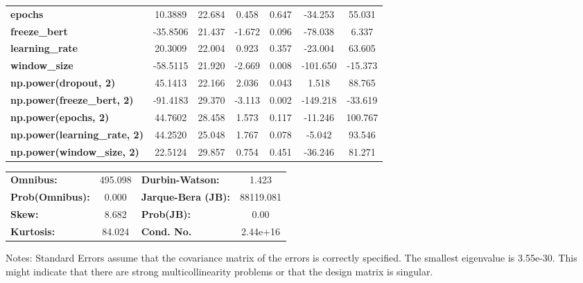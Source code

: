 \begin{center}
\begin{tabular}{lcccccc}
\textbf{epochs}                            &      10.3889  &       22.684     &     0.458  &         0.647        &      -34.253    &       55.031     \\
\textbf{freeze\_bert}                      &     -35.8506  &       21.437     &    -1.672  &         0.096        &      -78.038    &        6.337     \\
\textbf{learning\_rate}                    &      20.3009  &       22.004     &     0.923  &         0.357        &      -23.004    &       63.605     \\
\textbf{window\_size}                      &     -58.5115  &       21.920     &    -2.669  &         0.008        &     -101.650    &      -15.373     \\
\textbf{np.power(dropout, 2)}              &      45.1413  &       22.166     &     2.036  &         0.043        &        1.518    &       88.765     \\
\textbf{np.power(freeze\_bert, 2)}         &     -91.4183  &       29.370     &    -3.113  &         0.002        &     -149.218    &      -33.619     \\
\textbf{np.power(epochs, 2)}               &      44.7602  &       28.458     &     1.573  &         0.117        &      -11.246    &      100.767     \\
\textbf{np.power(learning\_rate, 2)}       &      44.2520  &       25.048     &     1.767  &         0.078        &       -5.042    &       93.546     \\
\textbf{np.power(window\_size, 2)}         &      22.5124  &       29.857     &     0.754  &         0.451        &      -36.246    &       81.271     \\
\bottomrule
\end{tabular}
\begin{tabular}{lclc}
\textbf{Omnibus:}       & 495.098 & \textbf{  Durbin-Watson:     } &     1.423  \\
\textbf{Prob(Omnibus):} &   0.000 & \textbf{  Jarque-Bera (JB):  } & 88119.081  \\
\textbf{Skew:}          &   8.682 & \textbf{  Prob(JB):          } &      0.00  \\
\textbf{Kurtosis:}      &  84.024 & \textbf{  Cond. No.          } &  2.44e+16  \\
\bottomrule
\end{tabular}
\end{center}

Notes: \newline
 [1] Standard Errors assume that the covariance matrix of the errors is correctly specified. \newline
 [2] The smallest eigenvalue is 3.55e-30. This might indicate that there are \newline
 strong multicollinearity problems or that the design matrix is singular.